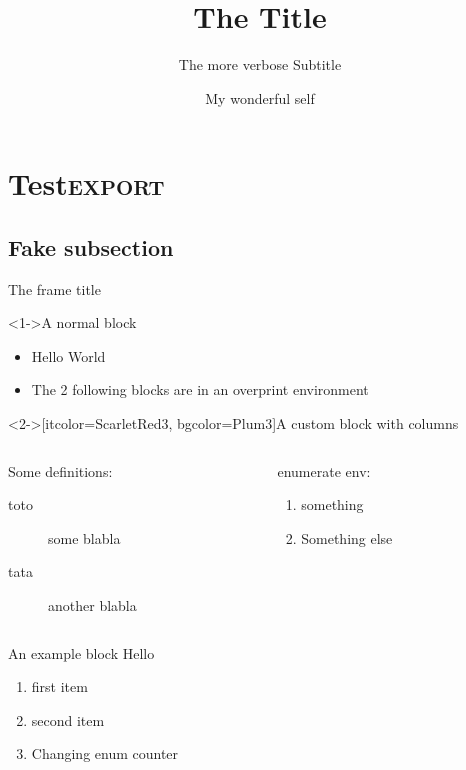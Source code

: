 \documentclass[presentation, aspectratio=169]{beamer}
\author{My wonderful self}
\date{\mydate}
\title{The Title}
\subtitle{The more verbose Subtitle}
\begin{document}
\maketitle
\section{Test\hfill{}\textsc{export}}
\label{sec:orgdaacb32}

\subsection{Fake subsection}
\label{sec:orga2e0f3d}

\begin{frame}[label={sec:orge509f46}]{The frame title}

\begin{block}<1->{A normal block}
\begin{itemize}
\item Hello World
\item The 2 following blocks are in an overprint environment
\end{itemize}
\end{block}

\begin{overprint}

\begin{customblock}<2->[itcolor=ScarletRed3, bgcolor=Plum3]{A custom block with columns}
\begin{columns}
\begin{column}{0.6\columnwidth}
Some definitions:
\begin{description}
\item[{toto}] some blabla
\item[{tata}] another blabla
\end{description}
\end{column}

\begin{column}{0.3\columnwidth}
enumerate env:
\begin{enumerate}
\item something
\item Something else
\end{enumerate}
\end{column}
\end{columns}
\end{customblock}


\begin{exampleblock}{An example block}
Hello
\end{exampleblock}
\end{overprint}

\begin{enumerate}
\item first item
\item second item
\setcounter{enumi}{5}
\item Changing enum counter
\end{enumerate}
\end{frame}
\end{document}

